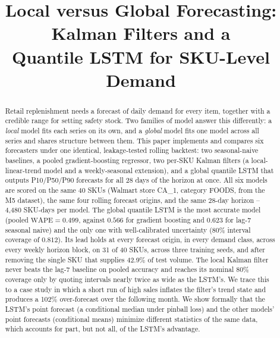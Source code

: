 \documentclass[conference]{IEEEtran}
\newcommand{\WAPE}{\mathrm{WAPE}}
\begin{document}
\title{Local versus Global Forecasting: Kalman Filters and a\\Quantile LSTM for SKU-Level Demand}

\author{
}

\maketitle

\begin{abstract}
Retail replenishment needs a forecast of daily demand for every item, together with a credible
range for setting safety stock. Two families of model answer this differently: a \emph{local}
model fits each series on its own, and a \emph{global} model fits one model across all series and
shares structure between them. This paper implements and compares six forecasters under one
identical, leakage-tested rolling backtest: two seasonal-naive baselines, a pooled gradient-boosting
regressor, two per-SKU Kalman filters (a local-linear-trend model and a weekly-seasonal extension),
and a global quantile LSTM that outputs P10/P50/P90 forecasts for all 28 days of the horizon at
once. All six models are scored on the same 40 SKUs (Walmart store CA\_1, category FOODS, from the
M5 dataset), the same four rolling forecast origins, and the same 28-day horizon --
4{,}480 SKU-days per model. The global quantile LSTM is the most accurate model
(pooled $\WAPE=0.499$, against $0.566$ for gradient boosting and $0.623$ for lag-7 seasonal naive)
and the only one with well-calibrated uncertainty (80\% interval coverage of $0.812$). Its lead
holds at every forecast origin, in every demand class, across every weekly horizon block, on 31 of
40 SKUs, across three training seeds, and after removing the single SKU that supplies 42.9\% of
test volume. The local Kalman filter never beats the lag-7 baseline on pooled accuracy and reaches
its nominal 80\% coverage only by quoting intervals nearly twice as wide as the LSTM's. We trace
this to a case study in which a short run of high sales inflates the filter's trend state and
produces a 102\% over-forecast over the following month. We show formally that the LSTM's point
forecast (a conditional median under pinball loss) and the other models' point forecasts
(conditional means) minimize different statistics of the same data, which accounts for part, but
not all, of the LSTM's advantage.
\end{abstract}
\end{document}
